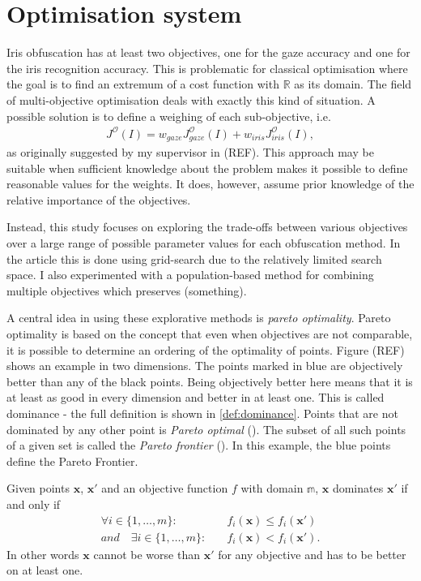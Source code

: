 \section{Optimisation system}
Iris obfuscation has at least two objectives, one for the gaze accuracy and one for the iris recognition accuracy. This is problematic for classical optimisation where the goal is to find an extremum of a cost function with $\mathbb{R}$ as its domain. The field of multi-objective optimisation deals with exactly this kind of situation. A possible solution is to define a weighing of each sub-objective, i.e.
\begin{align}
	J^{\mathcal{O}}(I) = w_{gaze}J_{gaze}^{\mathcal{O}}(I) +  w_{iris}J_{iris}^{\mathcal{O}}(I),
\end{align}
as originally suggested by my supervisor in (REF). This approach may be suitable when sufficient knowledge about the problem makes it possible to define reasonable values for the weights. It does, however, assume prior knowledge of the relative importance of the objectives. 

Instead, this study focuses on exploring the trade-offs between various objectives over a large range of possible parameter values for each obfuscation method. In the article this is done using grid-search due to the relatively limited search space. I also experimented with a population-based method for combining multiple objectives which preserves (something).

A central idea in using these explorative methods is \textit{pareto optimality}. Pareto optimality is based on the concept that even when objectives are not comparable, it is possible to determine an ordering of the optimality of points. Figure (REF) shows an example in two dimensions. The points marked in blue are objectively better than any of the black points. Being objectively better here means that it is at least as good in every dimension and better in at least one. This is called dominance - the full definition is shown in \cref{def:dominance}. Points that are not dominated by any other point is \textit{Pareto optimal} (). The subset of all such points of a given set is called the \textit{Pareto frontier} (). In this example, the blue points define the Pareto Frontier.

\begin{definition}[Dominance]\label{def:dominance}
Given points $\mathbf{x}$, $\mathbf{x'}$ and an objective function $f$ with domain $\mathbb{m}$, $\mathbf{x}$ dominates $\mathbf{x'}$ if and only if
\begin{align}
 \forall i \in \{1, \dots, m\} :&\quad f_i(\mathbf{x})\leq f_i(\mathbf{x'}) \\
and \quad \exists i \in \{1, \dots, m\} :&\quad f_i(\mathbf{x}) < f_i(\mathbf{x'}).
\end{align}
In other words $\mathbf{x}$ cannot be worse than $\mathbf{x'}$ for any objective and has to be better on at least one.
\end{definition}

